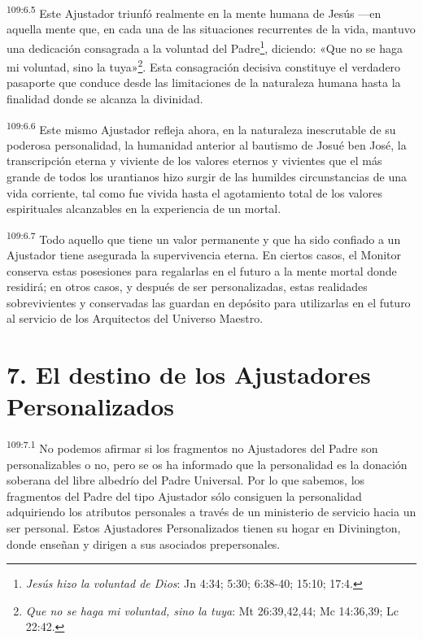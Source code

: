 \par
\textsuperscript{109:6.5} Este Ajustador triunfó realmente en la mente humana de Jesús ---en aquella mente que, en cada una de las situaciones recurrentes de la vida, mantuvo una dedicación consagrada a la voluntad del Padre\footnote{\textit{Jesús hizo la voluntad de Dios}: Jn 4:34; 5:30; 6:38-40; 15:10; 17:4.}, diciendo: «Que no se haga mi voluntad, sino la tuya»\footnote{\textit{Que no se haga mi voluntad, sino la tuya}: Mt 26:39,42,44; Mc 14:36,39; Lc 22:42.}. Esta consagración decisiva constituye el verdadero pasaporte que conduce desde las limitaciones de la naturaleza humana hasta la finalidad donde se alcanza la divinidad.

\par
\textsuperscript{109:6.6} Este mismo Ajustador refleja ahora, en la naturaleza inescrutable de su poderosa personalidad, la humanidad anterior al bautismo de Josué ben José, la transcripción eterna y viviente de los valores eternos y vivientes que el más grande de todos los urantianos hizo surgir de las humildes circunstancias de una vida corriente, tal como fue vivida hasta el agotamiento total de los valores espirituales alcanzables en la experiencia de un mortal.

\par
\textsuperscript{109:6.7} Todo aquello que tiene un valor permanente y que ha sido confiado a un Ajustador tiene asegurada la supervivencia eterna. En ciertos casos, el Monitor conserva estas posesiones para regalarlas en el futuro a la mente mortal donde residirá; en otros casos, y después de ser personalizadas, estas realidades sobrevivientes y conservadas las guardan en depósito para utilizarlas en el futuro al servicio de los Arquitectos del Universo Maestro.

\section*{7. El destino de los Ajustadores Personalizados}
\par
\textsuperscript{109:7.1} No podemos afirmar si los fragmentos no Ajustadores del Padre son personalizables o no, pero se os ha informado que la personalidad es la donación soberana del libre albedrío del Padre Universal. Por lo que sabemos, los fragmentos del Padre del tipo Ajustador sólo consiguen la personalidad adquiriendo los atributos personales a través de un ministerio de servicio hacia un ser personal. Estos Ajustadores Personalizados tienen su hogar en Divinington, donde enseñan y dirigen a sus asociados prepersonales.

